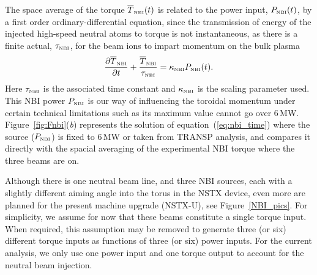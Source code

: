 \documentclass[12pt]{iopart}
\begin{document}
The space average of the torque $\overline{T}_\textrm{\tiny{NBI}}(t)$ is related to the power input, $P_\textrm{\tiny{NBI}}(t)$, by a first order ordinary-differential equation, since the transmission of energy of the injected high-speed neutral atoms to torque is not instantaneous, as there is a finite actual, $\tau_\textrm{\tiny{NBI}}$, for the beam ions to impart momentum on the bulk plasma
\begin{equation}
   \frac{\partial \overline{T}_\textrm{\tiny{NBI}}}{\partial t}
   + \frac{\overline{T}_\textrm{\tiny{NBI}}}{\tau_\textrm{\tiny{NBI}}}  = \kappa_\textrm{\tiny{NBI}} P_\textrm{\tiny{NBI}}(t).
   \label{eq:nbi_time}
\end{equation}
Here $\tau_\textrm{\tiny{NBI}}$ is the associated time constant and $\kappa_\textrm{\tiny{NBI}}$ is the scaling parameter used.  
This NBI power $P_\textrm{\tiny{NBI}}$ is our way of influencing the toroidal momentum under certain technical limitations such as its maximum value cannot go over 6\,MW.
Figure~\ref{fig:Fnbi}(\emph{b}) represents the solution of equation~(\ref{eq:nbi_time}) where the source ($P_\textrm{\tiny{NBI}}$) is fixed to 6\,MW or taken from TRANSP analysis, and compares it directly with the spacial averaging of the experimental NBI torque where the three beams are on.

Although there is one neutral beam line, and three NBI sources, each with a slightly different aiming angle into the torus in the NSTX device, even more are planned for the present machine upgrade (NSTX-U), see Figure~\ref{NBI_pics}. For simplicity, we assume for now that these beams constitute a single torque input.  When required, this assumption may be removed to generate three (or six) different torque inputs as functions of three (or six) power inputs.  For the current analysis, we only use one power input and one torque output to account for the neutral beam injection.
\end{document}
